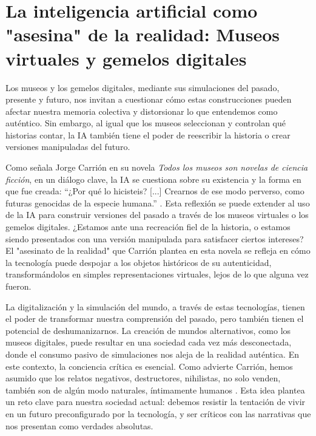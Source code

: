 \documentclass[
  spanish,
  11pt,
  a4paper,
]{scrbook}
\begin{document}
\section*{La inteligencia artificial como "asesina" de la realidad:
Museos virtuales y gemelos
digitales}\label{la-inteligencia-artificial-como-asesina-de-la-realidad-museos-virtuales-y-gemelos-digitales}


Los museos y los gemelos digitales, mediante sus simulaciones del
pasado, presente y futuro, nos invitan a cuestionar cómo estas
construcciones pueden afectar nuestra memoria colectiva y distorsionar
lo que entendemos como auténtico. Sin embargo, al igual que los museos
seleccionan y controlan qué historias contar, la IA también tiene el
poder de reescribir la historia o crear versiones manipuladas del
futuro.

Como señala Jorge Carrión en su novela \emph{Todos los museos son
novelas de ciencia ficción}, en un diálogo clave, la IA se cuestiona
sobre su existencia y la forma en que fue creada: ``¿Por qué lo
hicisteis? {[}...{]} Crearnos de ese modo perverso, como futuras
genocidas de la especie humana.'' \autocite[88]{Carrion2022}. Esta
reflexión se puede extender al uso de la IA para construir versiones del
pasado a través de los museos virtuales o los gemelos digitales.
¿Estamos ante una recreación fiel de la historia, o estamos siendo
presentados con una versión manipulada para satisfacer ciertos
intereses? El "asesinato de la realidad" que Carrión plantea en esta
novela se refleja en cómo la tecnología puede despojar a los objetos
históricos de su autenticidad, transformándolos en simples
representaciones virtuales, lejos de lo que alguna vez fueron.

La digitalización y la simulación del mundo, a través de estas
tecnologías, tienen el poder de transformar nuestra comprensión del
pasado, pero también tienen el potencial de deshumanizarnos. La creación
de mundos alternativos, como los museos digitales, puede resultar en una
sociedad cada vez más desconectada, donde el consumo pasivo de
simulaciones nos aleja de la realidad auténtica. En este contexto, la
conciencia crítica es esencial. Como advierte Carrión, hemos asumido que
los relatos negativos, destructores, nihilistas, no solo venden, también
son de algún modo naturales, íntimamente humanos
\autocite[88]{Carrion2022}. Esta idea plantea un reto clave para nuestra
sociedad actual: debemos resistir la tentación de vivir en un futuro
preconfigurado por la tecnología, y ser críticos con las narrativas que
nos presentan como verdades absolutas.
\end{document}
